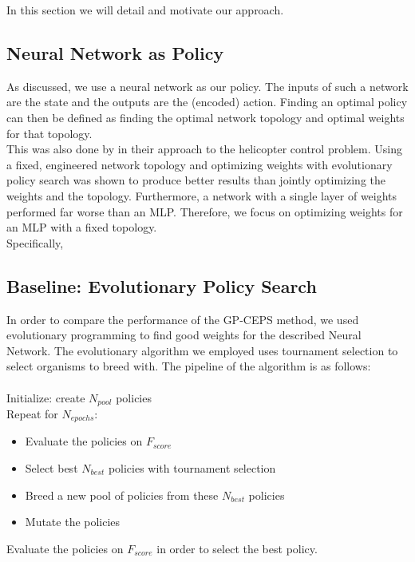 In this section we will detail and motivate our approach. 

\subsection{Neural Network as Policy}

As discussed, we use a neural network as our policy. The inputs of such a network are the state and the outputs are the (encoded) action. Finding an optimal policy can then be defined as finding the optimal network topology and optimal weights for that topology.\\
This was also done by \cite{koppejan2011neuroevolutionary} in their approach to the helicopter control problem. Using a fixed, engineered network topology and optimizing weights with evolutionary policy search was shown to produce better results than jointly optimizing the weights and the topology. Furthermore, a network with a single layer of weights performed far worse than an MLP. Therefore, we focus on optimizing weights for an MLP with a fixed topology.\\
Specifically, %

\subsection{Baseline: Evolutionary Policy Search}

In order to compare the performance of the GP-CEPS method, we used evolutionary programming to find good weights for the described Neural Network. 
The evolutionary algorithm we employed uses tournament selection to select organisms to breed with. The pipeline of the algorithm is as follows:\\ \\
Initialize: create $N_{pool}$ policies\\
Repeat for $N_{epochs}$:
\begin{itemize}
\item Evaluate the policies on $F_{score}$
\item Select best $N_{best}$ policies with tournament selection
\item Breed a new pool of policies from these $N_{best}$ policies
\item Mutate the policies
\end{itemize}
Evaluate the policies on $F_{score}$ in order to select the best policy.\\ \\

